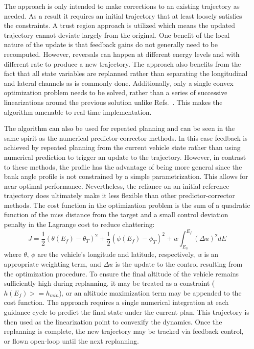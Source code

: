 \documentclass[10pt,a4paper]{article}
\begin{document}
	The approach is only intended to make corrections to an existing trajectory as needed. As a result it requires an initial trajectory that at least loosely satisfies the constraints. A trust region approach is utilized which means the updated trajectory cannot deviate largely from the original. One benefit of the local nature of the update is that feedback gains do not generally need to be recomputed. However, reversals can happen at different energy levels and with different rate to produce a new trajectory. The approach also benefits from the fact that all state variables are replanned rather than separating the longitudinal and lateral channels as is commonly done. Additionally, only a single convex optimization problem needs to be solved, rather than a series of successive linearizations around the previous solution unlike Refs.~\cite{SeqConProg,SuccConvex1,SuccConvex2,WangConvexTraj}. This makes the algorithm amenable to real-time implementation. 
	
	The algorithm can also be used for repeated planning and can be seen in the same spirit as the numerical predictor-corrector methods. In this case feedback is achieved by repeated planning from the current vehicle state rather than using numerical prediction to trigger an update to the trajectory. However, in contrast to these methods, the profile has the advantage of being more general since the bank angle profile is not constrained by a simple parametrization. This allows for near optimal performance. Nevertheless, the reliance on an initial reference trajectory does ultimately make it less flexible than other predictor-corrector methods. 
	The cost function in the optimization problem is the sum of a quadratic function of the miss distance from the target and a small control deviation penalty in the Lagrange cost to reduce chattering: 
	\begin{equation}
	J = \frac{1}{2}(\theta(E_f)-\theta_{T})^2 + \frac{1}{2}(\phi(E_f)-\phi_{T})^2 + w\int_{E_0}^{E_f}(\Delta u)^2dE
	\end{equation}
	where $\theta,\,\phi$ are the vehicle's longitude and latitude, respectively, \textit{w} is an appropriate weighting term, and $\Delta u$ is the update to the control resulting from the optimization procedure. To ensure the final altitude of the vehicle remains sufficiently high during replanning,  it may be treated as a constraint ($h(E_f)>=h_{min}$), or an altitude maximization term may be appended to the cost function. The approach requires a single numerical integration at each guidance cycle to predict the final state under the current plan. This trajectory is then used as the linearization point to convexify the dynamics. Once the replanning is complete, the new trajectory may be tracked via feedback control, or flown open-loop until the next replanning. 
\end{document}
